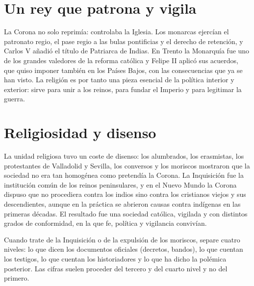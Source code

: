 \documentclass{book}
\begin{document}

\section{Un rey que patrona y vigila}

La Corona no solo reprimía: controlaba la Iglesia. Los monarcas ejercían el patronato regio, el pase regio a las bulas pontificias y el derecho de retención, y Carlos V añadió el título de Patriarca de Indias. En Trento la Monarquía fue uno de los grandes valedores de la reforma católica y Felipe II aplicó sus acuerdos, que quiso imponer también en los Países Bajos, con las consecuencias que ya se han visto. La religión es por tanto una pieza esencial de la política interior y exterior: sirve para unir a los reinos, para fundar el Imperio y para legitimar la guerra.


\section{Religiosidad y disenso}

La unidad religiosa tuvo un coste de disenso: los alumbrados, los erasmistas, los protestantes de Valladolid y Sevilla, los conversos y los moriscos mostraron que la sociedad no era tan homogénea como pretendía la Corona. La Inquisición fue la institución común de los reinos peninsulares, y en el Nuevo Mundo la Corona dispuso que no procediera contra los indios sino contra los cristianos viejos y sus descendientes, aunque en la práctica se abrieron causas contra indígenas en las primeras décadas. El resultado fue una sociedad católica, vigilada y con distintos grados de conformidad, en la que fe, política y vigilancia convivían.


\begin{tcolorbox}[title={Consejo}, studiumtip, breakable]

Cuando trate de la Inquisición o de la expulsión de los moriscos, separe cuatro niveles: lo que dicen los documentos oficiales (decretos, bandos), lo que cuentan los testigos, lo que cuentan los historiadores y lo que ha dicho la polémica posterior. Las cifras suelen proceder del tercero y del cuarto nivel y no del primero.

\end{tcolorbox}
\end{document}

